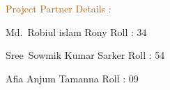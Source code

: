 \documentclass[12pt]{article}
\begin{document}
\vspace{\baselineskip}
\vspace{\baselineskip}

\vspace{\baselineskip}
\hspace{60 mm}
{\fontsize{18pt}{21.6pt}\selectfont \textcolor[HTML]{B45F06}{Project Partner Details :}\par}\par


\vspace{\baselineskip}

\hspace{60 mm}
{\fontsize{14pt}{16.8pt}\selectfont Md.\ Robiul islam Rony  Roll : 34\par}\par
	
\hspace{60 mm}
{\fontsize{14pt}{16.8pt}\selectfont Sree\ Sowmik Kumar Sarker  Roll : 54\par}\par
	
\hspace{60 mm}
{\fontsize{14pt}{16.8pt}\selectfont Afia Anjum Tamanna Roll : 09\par}\par


\vspace{\baselineskip}

\vspace{\baselineskip}

\vspace{\baselineskip}

\vspace{\baselineskip}

\vspace{\baselineskip}

\vspace{\baselineskip}

\vspace{\baselineskip}

\vspace{\baselineskip}

\vspace{\baselineskip}

\vspace{\baselineskip}

\vspace{\baselineskip}

\vspace{\baselineskip}
\end{document}
